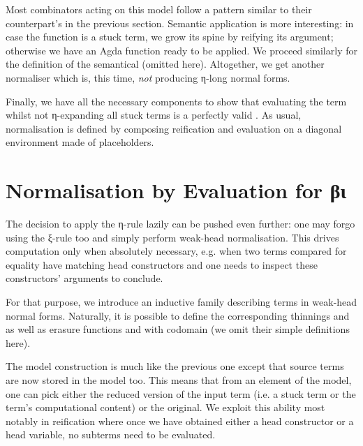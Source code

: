 
Most combinators acting on this model follow a pattern similar to their
counterpart's in the previous section. Semantic application is
more interesting: in case the function is a stuck term, we grow its
spine by reifying its argument; otherwise we have an Agda function ready
to be applied. We proceed similarly for the definition of the semantical
 (omitted here). Altogether, we get another
normaliser which is, this time, \emph{not} producing η-long normal forms.


Finally, we have all the necessary components to show that evaluating
the term whilst not η-expanding all stuck terms is a perfectly valid
. As usual, normalisation is defined by composing
reification and evaluation on a diagonal environment made of placeholders.


\section{Normalisation by Evaluation for βι}

The decision to apply the η-rule lazily can be pushed even further: one may
forgo using the ξ-rule too and simply perform weak-head normalisation. This
drives computation only when absolutely necessary, e.g.
when two terms compared for equality have matching head constructors
and one needs to inspect these constructors' arguments to conclude.

For that purpose, we introduce an inductive family describing terms in weak-head
normal forms. Naturally, it is possible to define the corresponding thinnings
 and  as well as erasure
functions  and 
with codomain  (we omit their simple definitions here).

The model construction is much like the previous one except
that source terms are now stored in the model too. This means that
from an element of the model, one can pick either the reduced version
of the input term (i.e. a stuck term or the term's computational
content) or the original. We exploit this ability most
notably in reification where once we have obtained either a
head constructor or a head variable, no subterms need to
be evaluated.



